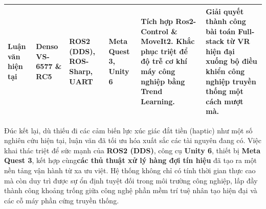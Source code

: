 \begin{table}[H]
{\begin{tabular}{|p{3.2cm}|p{2.5cm}|p{2.5cm}|p{3cm}|p{3.8cm}|p{3.8cm}|}
\textbf{Luận văn hiện tại} & \textbf{Denso VS-6577 \& RC5} & \textbf{ROS2 (DDS), ROS-Sharp, UART} & \textbf{Meta Quest 3, Unity 6} & \textbf{Tích hợp Ros2-Control \& MoveIt2. Khắc phục triệt để độ trễ cơ khí máy công nghiệp bằng Trend Learning.} & \textbf{Giải quyết thành công bài toán Full-stack từ VR hiện đại xuống bộ điều khiển công nghiệp truyền thống một cách mượt mà.} \\ \hline

\end{tabular}%
}
\end{table}

Đúc kết lại, dù thiếu đi các cảm biến lực xúc giác đắt tiền (haptic) như một số nghiên cứu hiện tại, luận văn đã tối ưu hóa xuất sắc các tài nguyên đang có. Việc khai thác triệt để sức mạnh của \textbf{ROS2 (DDS)}, công cụ \textbf{Unity 6}, thiết bị \textbf{Meta Quest 3}, kết hợp cùng\textbf{các thủ thuật xử lý hàng đợi tín hiệu} đã tạo ra một nền tảng vận hành từ xa ưu việt. Hệ thống không chỉ có tính thời gian thực cao mà còn duy trì được sự ổn định tuyệt đối trong môi trường công nghiệp, lấp đầy thành công khoảng trống giữa công nghệ phần mềm trí tuệ nhân tạo hiện đại và các cỗ máy phần cứng truyền thống.




